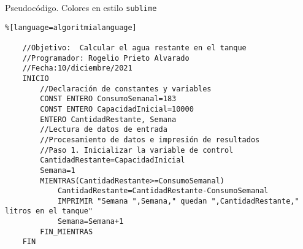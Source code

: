\documentclass[spanish,11pt,twoside]{article}
\newcommand{\myawesomebox}[2]{ %
	\awesomebox[uasblue]{2pt}{#1}{uasblue}{#2}
}
\newcommand{\myawesomeboxshort}[3]{ %
	\awesomebox[uasblue]{2pt}{#1}{uasblue}{\textcolor{uasblue}{\textbf{\textsf{#2}}} #3}
}
\begin{document}



\vspace{120px}





Pseudocódigo. Colores en estilo \texttt{sublime} 
\begin{mdframed}[backgroundcolor=clr-background,topline=true,bottomline=true,leftline=false,rightline=false,innerleftmargin=\leftskip, innertopmargin=0pt]
\begin{lstlisting}%[language=algoritmialanguage]
	
	//Objetivo:  Calcular el agua restante en el tanque 
	//Programador: Rogelio Prieto Alvarado
	//Fecha:10/diciembre/2021
	INICIO
		//Declaración de constantes y variables
		CONST ENTERO ConsumoSemanal=183
		CONST ENTERO CapacidadInicial=10000
		ENTERO CantidadRestante, Semana
		//Lectura de datos de entrada
		//Procesamiento de datos e impresión de resultados
		//Paso 1. Inicializar la variable de control
		CantidadRestante=CapacidadInicial
		Semana=1
		MIENTRAS(CantidadRestante>=ConsumoSemanal)
			CantidadRestante=CantidadRestante-ConsumoSemanal
			IMPRIMIR "Semana ",Semana," quedan ",CantidadRestante," litros en el tanque"
			Semana=Semana+1
		FIN_MIENTRAS
	FIN	
\end{lstlisting}
\end{mdframed}
\end{document}
